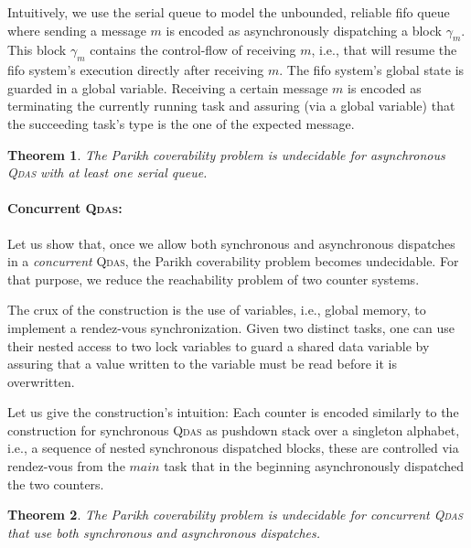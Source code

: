 \documentclass[runningheads,oribibl,]{article}
\newcommand{\main}{\ensuremath{\textit{main}}\xspace}
\newcommand{\qdas}{\textsc{Qdas}\xspace}
\newcommand{\fifo}{fifo\xspace}
\newtheorem{theorem}{Theorem}{}
\begin{document}
Intuitively, we use the serial queue to
model the unbounded, reliable fifo queue where sending a message $m$
is encoded as asynchronously dispatching a block $\gamma_m$. This
block $\gamma_m$ contains the control-flow of
receiving $m$, i.e., that will resume the \fifo system's execution
directly after receiving $m$. The \fifo system's global state is
guarded in a global variable. Receiving a certain message $m$
is encoded as terminating the currently running task and assuring
(via a global variable) that the succeeding task's type is the one of
the expected message.















\begin{theorem}\label{the:async-seri-undec}
  The Parikh coverability problem is undecidable for asynchronous
  \qdas with at least one serial queue.
\end{theorem}


\paragraph{\bf Concurrent \qdas:}
Let us show that, once we allow both
synchronous and asynchronous dispatches in a \emph{concurrent} \qdas,
the Parikh coverability problem becomes undecidable.
For that purpose, we reduce the reachability problem of two counter
systems.

The crux of the construction is the use of
variables, i.e., global memory, to implement a rendez-vous
synchronization. Given two distinct tasks, one can use their nested
access to two lock variables to guard a shared data variable by
assuring that a value written to the variable must be read before it
is overwritten.

Let us give the construction's intuition: Each counter is
encoded similarly to the construction for synchronous \qdas as
pushdown stack over a singleton alphabet, i.e., a sequence of nested
synchronous dispatched blocks, these are controlled via rendez-vous
 from the \main task that in the beginning
asynchronously dispatched the two counters.







\begin{theorem}\label{thm:concqdasundec}
  The Parikh coverability problem is undecidable for concurrent \qdas that
  use both synchronous and asynchronous dispatches.
\end{theorem}
\end{document}
